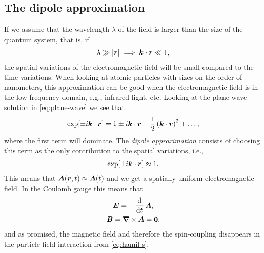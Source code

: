         \subsection{The dipole approximation}
            If we assume that the wavelength $\lambda$ of the field is larger
            than the size of the quantum system, that is, if
            \begin{align}
                \lambda \gg \abs{\boldsymbol{r}}
                \implies
                \boldsymbol{k}\cdot\boldsymbol{r} \ll 1,
            \end{align}
            the spatial variations of the electromagnetic field will be small
            compared to the time variations.
            When looking at atomic particles with sizes on the order of
            nanometers, this approximation can be good when the electromagnetic
            field is in the low frequency domain, e.g., infrared light, etc.
            Looking at the plane wave solution in \autoref{eq:plane-wave} we see
            that
            \begin{align}
                \exp[\pm i\boldsymbol{k}\cdot\boldsymbol{r}]
                = 1 \pm i\boldsymbol{k}\cdot\boldsymbol{r}
                - \frac{1}{2}\left( 
                    \boldsymbol{k}\cdot\boldsymbol{r}
                 \right)^2
                + \dots,
            \end{align}
            where the first term will dominate.
            The \emph{dipole approximation} consists of choosing this term as
            the only contribution to the spatial variations, i.e.,
            \begin{align}
                \exp[\pm i\boldsymbol{k}\cdot\boldsymbol{r}] \approx 1.
            \end{align}
            This means that $\boldsymbol{A}(\boldsymbol{r}, t) \approx \boldsymbol{A}(t)$ and we get
            a spatially uniform electromagnetic field.
            In the Coulomb gauge this means that
            \begin{gather}
                \vfg{E} = -\dod{}{t}\vfg{A},
                \label{eq:electric-field-dipole}
                \\
                \vfg{B} = \vfg{\nabla}\times \vfg{A} = \vfg{0},
            \end{gather}
            and as promised, the magnetic field and therefore the spin-coupling
            disappears in the particle-field interaction from
            \autoref{eq:hamil-s}.

